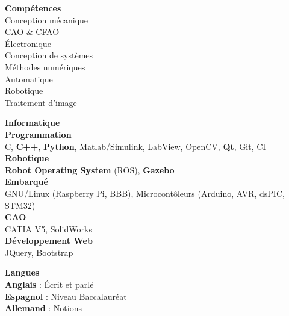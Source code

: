 \documentclass[a4paper,11pt,final]{memoir}
\newcommand{\SmallSep}{\vspace{0.5em}}
\newcommand{\SkillSection}[1]
	{\normalsize{\textbf{#1\\}}\normalfont\small}%
\newcommand{\SkillItem}[1]
{\vspace{0.25em}\textbf{\color{RoyalBlue} #1}\normalfont}
\begin{document}
\begin{flushleft}
\SkillSection{Compétences}
Conception mécanique\\
CAO \& CFAO\\
Électronique\\
Conception de systèmes\\
Méthodes numériques\\
Automatique\\
Robotique\\
Traitement d'image
\SmallSep

\SkillSection{Informatique}
\vspace{-0.25em}
\SkillItem{Programmation}\\
	C, \textbf{C++}, \textbf{Python}, Matlab/Simulink, LabView, OpenCV, \textbf{Qt}, Git, CI\\ %
\SkillItem{Robotique}\\
\textbf{Robot Operating System} (ROS), \textbf{Gazebo}\\
\SkillItem{Embarqué}\\
GNU/Linux (Raspberry Pi, BBB), Microcontôleurs (Arduino, AVR, dsPIC, STM32)\\%
\SkillItem{CAO}\\
CATIA V5, SolidWorks\\
\SkillItem{Développement Web}\\
JQuery, Bootstrap\\
\SmallSep

\SkillSection{Langues}
\vspace{-0.25em}
\SkillItem{Anglais} : Écrit et parlé\\%
\SkillItem{Espagnol} : Niveau Baccalauréat\\
\SkillItem{Allemand} : Notions
\SmallSep


\end{flushleft}
\end{document}

